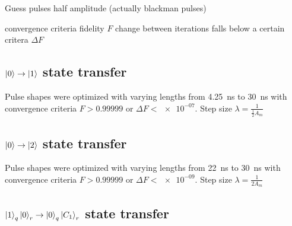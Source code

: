 \documentclass[main.tex]{subfiles}
\begin{document}
Guess pulses half amplitude (actually blackman pulses)

convergence criteria
fidelity \(F\)
change between iterations falls below a certain critera \(\Delta F\)

\subsection{\texorpdfstring{\boldmath\(\ket{0}\rightarrow\ket{1}\)}{0 -> 1} state transfer}
Pulse shapes were optimized with varying lengths from \SI{4.25}{\nano\second} to \SI{30}{\nano\second} with convergence criteria \(F>0.99999\) or \(\Delta F < \num{e-07}\). Step size \(\lambda = \frac{1}{\frac{1}{2}A_{m}}\)

\subsection{\texorpdfstring{\boldmath\(\ket{0}\rightarrow\ket{2}\)}{0 -> 2} state transfer}
Pulse shapes were optimized with varying lengths from \SI{22}{\nano\second} to \SI{30}{\nano\second} with convergence criteria \(F>0.99999\) or \(\Delta F < \num{e-09}\). Step size \(\lambda = \frac{1}{2A_{m}}\)

\subsection{\texorpdfstring{\boldmath\( \ket{1}_q\ket{0}_r\rightarrow\ket{0}_q\ket{C_1}_r \)}{10 -> 0C1} state transfer}
\end{document}
